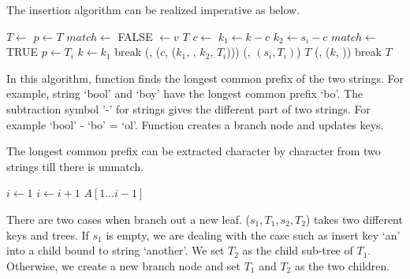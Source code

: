 \documentclass[b5paper]{article}
\begin{document}
The insertion algorithm can be realized imperative as below.

\begin{algorithmic}[1]
   \State $T \gets$ 
  \EndIf
  \State $p \gets T$
  \Loop
    \State $match \gets$ FALSE
        \State {} $\gets v$ 
        \State \Return $T$
      \EndIf
      \State $c \gets$ 
      \State $k_1 \gets k - c$
      \State $k_2 \gets s_i - c$
        \State $match \gets$ TRUE
         
          \State $p \gets T_i$
          \State $k \gets k_1$
          \State break
        \Else {}
          \State {}(, ($c$, ($k_1$, , $k_2$, $T_i$)))
          \State {}(, $(s_i, T_i)$)
          \State \Return $T$
        \EndIf
      \EndIf
    \EndFor
     
      \State {}(, ($k$, ))
      \State break
    \EndIf
  \EndLoop
  \State \Return $T$
\EndFunction
\end{algorithmic}

In this algorithm, function  finds the longest
common prefix of the two strings. For example, string `bool' and `boy'
have the longest common prefix `bo'. The subtraction symbol '-' for
strings gives the different part of two strings. For example `bool' - `bo' = `ol'. Function  creates a branch node and updates keys.

The longest common prefix can be extracted character by character from two strings till there is unmatch.

\begin{algorithmic}[1]
  \State $i \gets 1 $
    \State $i \gets i + 1$
  \EndWhile
  \State \Return $A[1...i-1]$
\EndFunction
\end{algorithmic}

There are two cases when branch out a new leaf. ($s_1, T_1, s_2, T_2$)
takes two different keys and trees. If $s_1$ is empty, we are
dealing with the case such as insert key `an' into a child bound to
string `another'. We set $T_2$ as the child sub-tree of $T_1$. Otherwise,
we create a new branch node and set $T_1$ and $T_2$ as the two children.
\end{document}
